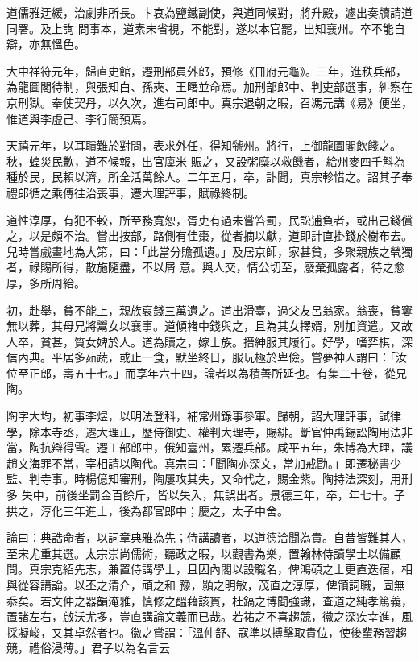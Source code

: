 \begin{pinyinscope}
 道儒雅迂緩，治劇非所長。卞哀為鹽鐵副使，與道同候對，將升殿，遽出奏牘請道同署。及上詢
 問事本，道素未省視，不能對，遂以本官罷，出知襄州。卒不能自辯，亦無慍色。



 大中祥符元年，歸直史館，遷刑部員外郎，預修《冊府元龜》。三年，進秩兵部，為龍圖閣待制，與張知白、孫奭、王曙並命焉。加刑部郎中、判吏部選事，糾察在京刑獄。奉使契丹，以久次，進右司郎中。真宗退朝之暇，召馮元講《易》便坐，惟道與李虛己、李行簡預焉。



 天禧元年，以耳聵難於對問，表求外任，得知虢州。將行，上御龍圖閣飲餞之。秋，蝗災民歉，道不候報，出官廩米
 賑之，又設粥糜以救饑者，給州麥四千斛為種於民，民賴以濟，所全活萬餘人。二年五月，卒，訃聞，真宗軫惜之。詔其子奉禮郎循之乘傳往治喪事，遷大理評事，賦祿終制。



 道性淳厚，有犯不較，所至務寬恕，胥吏有過未嘗笞罰，民訟逋負者，或出己錢償之，以是頗不治。嘗出按部，路側有佳棗，從者摘以獻，道即計直掛錢於樹布去。兒時嘗戲畫地為大第，曰：「此當分贍孤遺。」及居京師，家甚貧，多聚親族之煢獨者，祿賜所得，散施隨盡，不以屑
 意。與人交，情公切至，廢棄孤露者，待之愈厚，多所周給。



 初，赴舉，貧不能上，親族裒錢三萬遺之。道出滑臺，過父友呂翁家。翁喪，貧窶無以葬，其母兄將鬻女以襄事。道傾褚中錢與之，且為其女擇婿，別加資遣。又故人卒，貧甚，質女婢於人。道為贖之，嫁士族。搢紳服其履行。好學，嗜弈棋，深信內典。平居多茹蔬，或止一食，默坐終日，服玩極於卑儉。嘗夢神人謂曰：「汝位至正郎，壽五十七。」而享年六十四，論者以為積善所延也。有集二十卷，從兄
 陶。



 陶字大均，初事李煜，以明法登科，補常州錄事參軍。歸朝，詔大理評事，試律學，除本寺丞，遷大理正，歷侍御史、權判大理寺，賜緋。斷官仲禹錫訟陶用法非當，陶抗辯得雪。遷工部郎中，俄知臺州，累遷兵部。咸平五年，朱博為大理，議趙文海罪不當，宰相請以陶代。真宗曰：「聞陶亦深文，當加戒勖。」即遷秘書少監、判寺事。時楊億知審刑，陶屢攻其失，又命代之，賜金紫。陶持法深刻，用刑多
 失中，前後坐罰金百餘斤，皆以失入，無誤出者。景德三年，卒，年七十。子拱之，淳化三年進士，後為都官郎中；慶之，太子中舍。



 論曰：典誥命者，以詞章典雅為先；侍講讀者，以道德洽聞為貴。自昔皆難其人，至宋尤重其選。太宗崇尚儒術，聽政之暇，以觀書為樂，置翰林侍讀學士以備顧問。真宗克紹先志，兼置侍講學士，且因內閣以設職名，俾鴻碩之士更直迭宿，相與從容講論。以丕之清介，頑之和
 豫，顥之明敏，茂直之淳厚，俾領詞職，固無忝矣。若文仲之器韻淹雅，慎修之醞藉該貫，杜鎬之博聞強識，查道之純孝篤義，置諸左右，啟沃尤多，豈直講論文義而已哉。若祐之不喜趨競，徽之深疾幸進，風採凝峻，又其卓然者也。徽之嘗謂：「溫仲舒、寇準以搏擊取貴位，使後輩務習趨競，禮俗浸薄。」君子以為名言云



\end{pinyinscope}